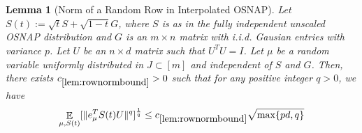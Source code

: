\documentclass[11pt]{amsart}
\numberwithin{equation}{section}
\numberwithin{equation}{section}
\DeclareMathOperator{\E}{\mathbb{E}}
\DeclarePairedDelimiter{\norm}{\lVert}{\rVert}
\newtheorem{lemma}[theorem]{Lemma}
\theoremstyle{remark}
\theoremstyle{definition}
\begin{document}
\begin{lemma}[Norm of a Random Row in Interpolated OSNAP]\label{lem:rownormbound}
    Let $S(t):= \sqrt{t}S + \sqrt{1-t}G$, where $S$ is as in the fully independent unscaled OSNAP distribution and $G$ is an $m \times n$ matrix with i.i.d. Gausian entries with variance $p$. Let $U$ be an $n \times d$ matrix such that $U^TU=I$. Let $\mu$ be a random variable uniformly distributed in $J \subset [m]$ and independent of $S$ and $G$. Then, there exists $c_{\ref*{lem:rownormbound}}> 0$ such that for any positive integer $q>0$, we have
    \begin{align*}
        \E_{\mu, S(t)} [ \norm{e_{\mu}^TS(t)U}^{q} ]^\frac{1}{q} \le c_{\ref*{lem:rownormbound}}\sqrt{\max\{pd,q \}} 
    \end{align*}

\end{lemma}
\end{document}
